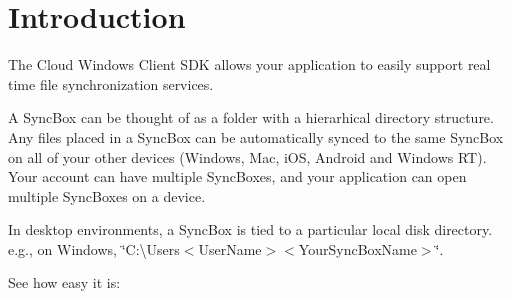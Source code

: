 \hypertarget{index_intro_sec}{}\section{Introduction}\label{index_intro_sec}
The Cloud Windows Client S\-D\-K allows your application to easily support real time file synchronization services.

A Sync\-Box can be thought of as a folder with a hierarhical directory structure. Any files placed in a Sync\-Box can be automatically synced to the same Sync\-Box on all of your other devices (Windows, Mac, i\-O\-S, Android and Windows R\-T). Your account can have multiple Sync\-Boxes, and your application can open multiple Sync\-Boxes on a device.

In desktop environments, a Sync\-Box is tied to a particular local disk directory. e.\-g., on Windows, \char`\"{}\-C\-:\textbackslash{}\-Users$<$\-User\-Name$>$$<$\-Your\-Sync\-Box\-Name$>$\char`\"{}.

See how easy it is\-:


